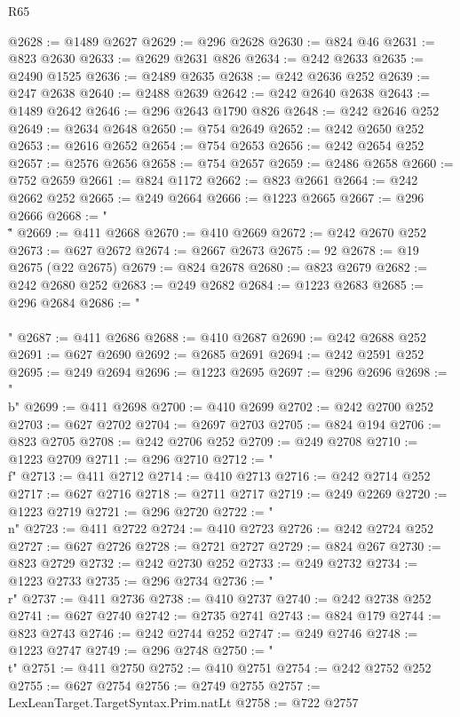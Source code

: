 \begin{lexlean}{R65}
\begin{coremodule}
{@2628 := @1489 @2627
@2629 := @296 @2628
@2630 := @824 @46
@2631 := @823 @2630
@2633 := @2629 @2631 @826
@2634 := @242 @2633
@2635 := @2490 @1525
@2636 := @2489 @2635
@2638 := @242 @2636 @252
@2639 := @247 @2638
@2640 := @2488 @2639
@2642 := @242 @2640 @2638
@2643 := @1489 @2642
@2646 := @296 @2643 @1790 @826
@2648 := @242 @2646 @252
@2649 := @2634 @2648
@2650 := @754 @2649
@2652 := @242 @2650 @252
@2653 := @2616 @2652
@2654 := @754 @2653
@2656 := @242 @2654 @252
@2657 := @2576 @2656
@2658 := @754 @2657
@2659 := @2486 @2658
@2660 := @752 @2659
@2661 := @824 @1172
@2662 := @823 @2661
@2664 := @242 @2662 @252
@2665 := @249 @2664
@2666 := @1223 @2665
@2667 := @296 @2666
@2668 := "\\\""
@2669 := @411 @2668
@2670 := @410 @2669
@2672 := @242 @2670 @252
@2673 := @627 @2672
@2674 := @2667 @2673
@2675 := 92
@2678 := @19 @2675 (@22 @2675)
@2679 := @824 @2678
@2680 := @823 @2679
@2682 := @242 @2680 @252
@2683 := @249 @2682
@2684 := @1223 @2683
@2685 := @296 @2684
@2686 := "\\\\"
@2687 := @411 @2686
@2688 := @410 @2687
@2690 := @242 @2688 @252
@2691 := @627 @2690
@2692 := @2685 @2691
@2694 := @242 @2591 @252
@2695 := @249 @2694
@2696 := @1223 @2695
@2697 := @296 @2696
@2698 := "\\b"
@2699 := @411 @2698
@2700 := @410 @2699
@2702 := @242 @2700 @252
@2703 := @627 @2702
@2704 := @2697 @2703
@2705 := @824 @194
@2706 := @823 @2705
@2708 := @242 @2706 @252
@2709 := @249 @2708
@2710 := @1223 @2709
@2711 := @296 @2710
@2712 := "\\f"
@2713 := @411 @2712
@2714 := @410 @2713
@2716 := @242 @2714 @252
@2717 := @627 @2716
@2718 := @2711 @2717
@2719 := @249 @2269
@2720 := @1223 @2719
@2721 := @296 @2720
@2722 := "\\n"
@2723 := @411 @2722
@2724 := @410 @2723
@2726 := @242 @2724 @252
@2727 := @627 @2726
@2728 := @2721 @2727
@2729 := @824 @267
@2730 := @823 @2729
@2732 := @242 @2730 @252
@2733 := @249 @2732
@2734 := @1223 @2733
@2735 := @296 @2734
@2736 := "\\r"
@2737 := @411 @2736
@2738 := @410 @2737
@2740 := @242 @2738 @252
@2741 := @627 @2740
@2742 := @2735 @2741
@2743 := @824 @179
@2744 := @823 @2743
@2746 := @242 @2744 @252
@2747 := @249 @2746
@2748 := @1223 @2747
@2749 := @296 @2748
@2750 := "\\t"
@2751 := @411 @2750
@2752 := @410 @2751
@2754 := @242 @2752 @252
@2755 := @627 @2754
@2756 := @2749 @2755
@2757 := LexLeanTarget.TargetSyntax.Prim.natLt
@2758 := @722 @2757
}
\end{coremodule}
\end{lexlean}
